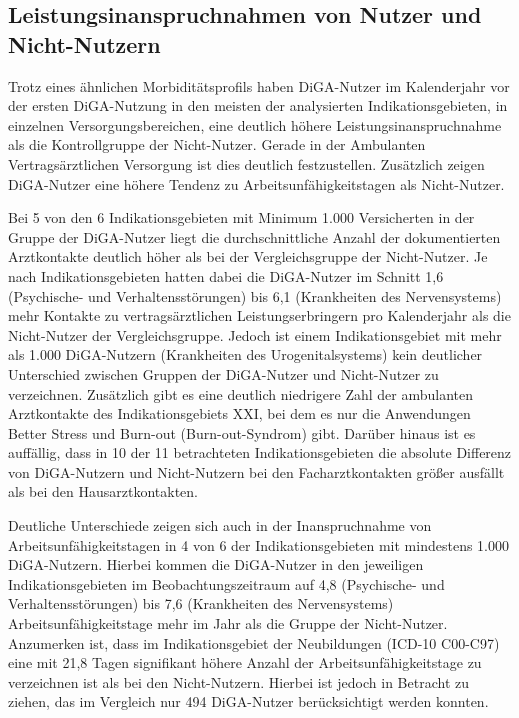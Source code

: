 \documentclass{article}
\begin{document}
		\subsection{Leistungsinanspruchnahmen von Nutzer und Nicht-Nutzern}
			Trotz eines ähnlichen Morbiditätsprofils haben DiGA-Nutzer im Kalenderjahr vor der ersten DiGA-Nutzung in den meisten der analysierten Indikationsgebieten, in einzelnen Versorgungsbereichen, eine deutlich höhere Leistungsinanspruchnahme als die Kontrollgruppe der Nicht-Nutzer. Gerade in der Ambulanten Vertragsärztlichen Versorgung ist dies deutlich festzustellen. Zusätzlich zeigen DiGA-Nutzer eine höhere Tendenz zu Arbeitsunfähigkeitstagen als Nicht-Nutzer.\par
			Bei 5 von den 6 Indikationsgebieten mit Minimum 1.000 Versicherten in der Gruppe der DiGA-Nutzer liegt die durchschnittliche Anzahl der dokumentierten Arztkontakte deutlich höher als bei der Vergleichsgruppe der Nicht-Nutzer. Je nach Indikationsgebieten hatten dabei die DiGA-Nutzer im Schnitt 1,6 (Psychische- und Verhaltensstörungen) bis 6,1 (Krankheiten des Nervensystems) mehr Kontakte zu vertragsärztlichen Leistungserbringern pro Kalenderjahr als die Nicht-Nutzer der Vergleichsgruppe. Jedoch ist einem Indikationsgebiet mit mehr als 1.000 DiGA-Nutzern (Krankheiten des Urogenitalsystems) kein deutlicher Unterschied zwischen Gruppen der DiGA-Nutzer und Nicht-Nutzer zu verzeichnen. Zusätzlich gibt es eine deutlich niedrigere Zahl der ambulanten Arztkontakte des Indikationsgebiets XXI, bei dem es nur die Anwendungen Better Stress und Burn-out (Burn-out-Syndrom) gibt. Darüber hinaus ist es auffällig, dass in 10 der 11 betrachteten Indikationsgebieten die absolute Differenz von DiGA-Nutzern und Nicht-Nutzern bei den Facharztkontakten größer ausfällt als bei den Hausarztkontakten.\par 
			Deutliche Unterschiede zeigen sich auch in der Inanspruchnahme von Arbeitsunfähigkeitstagen in 4 von 6 der Indikationsgebieten mit mindestens 1.000 DiGA-Nutzern. Hierbei kommen die DiGA-Nutzer in den jeweiligen Indikationsgebieten im Beobachtungszeitraum auf 4,8 (Psychische- und Verhaltensstörungen) bis 7,6 (Krankheiten des Nervensystems) Arbeitsunfähigkeitstage mehr im Jahr als die Gruppe der Nicht-Nutzer. Anzumerken ist, dass im Indikationsgebiet der Neubildungen (ICD-10 C00-C97) eine mit 21,8 Tagen signifikant höhere Anzahl der Arbeitsunfähigkeitstage zu verzeichnen ist als bei den Nicht-Nutzern. Hierbei ist jedoch in Betracht zu ziehen, das im Vergleich nur 494 DiGA-Nutzer berücksichtigt werden konnten.\par
\end{document}
